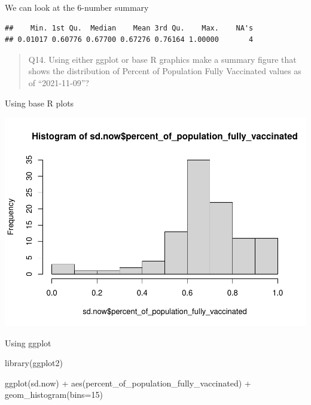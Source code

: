 \documentclass[
]{article}
\newenvironment{Shaded}{\begin{snugshade}}{\end{snugshade}}
\newcommand{\AttributeTok}[1]{\textcolor[rgb]{0.77,0.63,0.00}{#1}}
\newcommand{\DecValTok}[1]{\textcolor[rgb]{0.00,0.00,0.81}{#1}}
\newcommand{\FunctionTok}[1]{\textcolor[rgb]{0.00,0.00,0.00}{#1}}
\newcommand{\NormalTok}[1]{#1}
\newcommand{\SpecialCharTok}[1]{\textcolor[rgb]{0.00,0.00,0.00}{#1}}
\begin{document}
We can look at the 6-number summary

\begin{Shaded}
\end{Shaded}

\begin{verbatim}
##    Min. 1st Qu.  Median    Mean 3rd Qu.    Max.    NA's 
## 0.01017 0.60776 0.67700 0.67276 0.76164 1.00000       4
\end{verbatim}

\begin{quote}
Q14. Using either ggplot or base R graphics make a summary figure that
shows the distribution of Percent of Population Fully Vaccinated values
as of ``2021-11-09''?
\end{quote}

Using base R plots

\begin{Shaded}
\end{Shaded}

\includegraphics{class17_files/figure-latex/unnamed-chunk-22-1.pdf}

Using ggplot

\begin{Shaded}
\begin{Highlighting}[]
\FunctionTok{library}\NormalTok{(ggplot2)}

\FunctionTok{ggplot}\NormalTok{(sd.now) }\SpecialCharTok{+}
  \FunctionTok{aes}\NormalTok{(percent\_of\_population\_fully\_vaccinated) }\SpecialCharTok{+}
  \FunctionTok{geom\_histogram}\NormalTok{(}\AttributeTok{bins=}\DecValTok{15}\NormalTok{)}
\end{Highlighting}
\end{Shaded}
\end{document}
